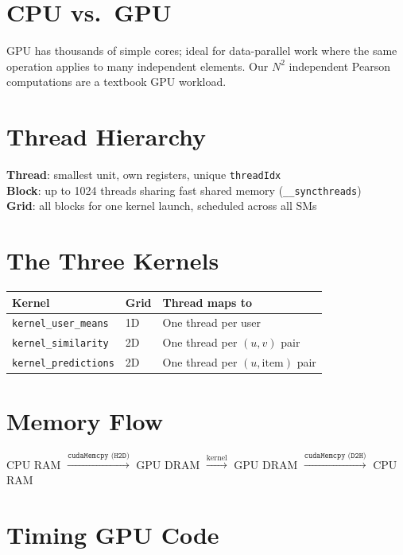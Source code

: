 \documentclass[12pt,a4paper]{report}
\begin{document}
\section{CPU vs.\ GPU}

GPU has thousands of simple cores; ideal for data-parallel work where the same
operation applies to many independent elements.  Our $N^2$ independent Pearson
computations are a textbook GPU workload.

\section{Thread Hierarchy}

\textbf{Thread}: smallest unit, own registers, unique \texttt{threadIdx}\\
\textbf{Block}: up to 1024 threads sharing fast shared memory (\texttt{\_\_syncthreads})\\
\textbf{Grid}: all blocks for one kernel launch, scheduled across all SMs

\section{The Three Kernels}

\begin{center}
\begin{tabular}{lll}
\toprule
Kernel & Grid & Thread maps to \\
\midrule
\texttt{kernel\_user\_means} & 1D & One thread per user \\
\texttt{kernel\_similarity} & 2D & One thread per $(u,v)$ pair \\
\texttt{kernel\_predictions} & 2D & One thread per $(u,\text{item})$ pair \\
\bottomrule
\end{tabular}
\end{center}

\section{Memory Flow}

\begin{center}
CPU RAM $\xrightarrow{\texttt{cudaMemcpy (H2D)}}$ GPU DRAM
$\xrightarrow{\text{kernel}}$ GPU DRAM
$\xrightarrow{\texttt{cudaMemcpy (D2H)}}$ CPU RAM
\end{center}

\section{Timing GPU Code}
\end{document}

